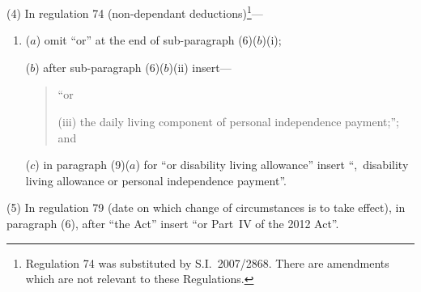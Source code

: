 \documentclass[12pt,a4paper]{article}
\begin{document}
(4) In regulation 74 (non-dependant deductions)\footnote{Regulation 74 was substituted by S.I.~2007/2868. There are amendments which are not relevant to these Regulations.}—
\begin{enumerate}\item[]
($a$) omit “or” at the end of sub-paragraph (6)($b$)(i);

($b$) after sub-paragraph (6)($b$)(ii)  insert—
\begin{quotation}
“or

(iii) the daily living component of personal independence payment;”; and
\end{quotation}

($c$) in paragraph (9)($a$)  for “or disability living allowance” insert “,~disability living allowance or personal independence payment”.
\end{enumerate}

(5) In regulation 79 (date on which change of circumstances is to take effect), in paragraph (6), after “the Act” insert “or Part~IV of the 2012 Act”.
\end{document}
